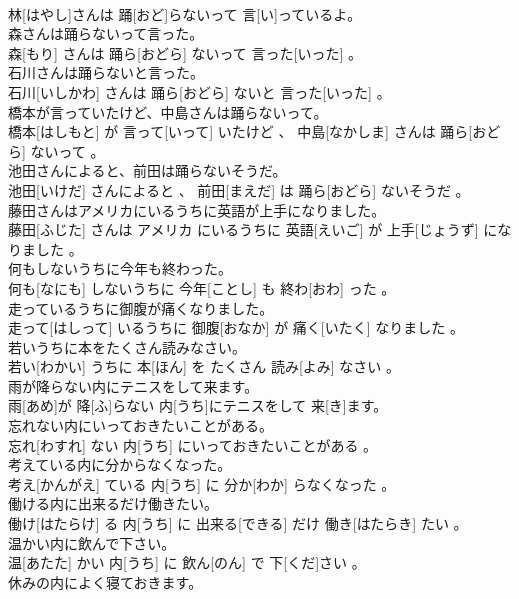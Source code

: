 \documentclass[8pt]{extreport}
\begin{document}
\begin{CJK}{UTF8}{min}
\\	林[はやし]さんは 踊[おど]らないって 言[い]っているよ。
\\	森さんは踊らないって言った。	
\\	森[もり] さんは 踊ら[おどら] ないって 言った[いった] 。
\\	石川さんは踊らないと言った。	
\\	石川[いしかわ] さんは 踊ら[おどら] ないと 言った[いった] 。
\\	橋本が言っていたけど、中島さんは踊らないって。	
\\	橋本[はしもと] が 言って[いって] いたけど 、 中島[なかしま] さんは 踊ら[おどら] ないって 。
\\	池田さんによると、前田は踊らないそうだ。	
\\	池田[いけだ] さんによると 、 前田[まえだ] は 踊ら[おどら] ないそうだ 。
\\	藤田さんはアメリカにいるうちに英語が上手になりました。	
\\	藤田[ふじた] さんは アメリカ にいるうちに 英語[えいご] が 上手[じょうず] になりました 。
\\	何もしないうちに今年も終わった。	
\\	何も[なにも] しないうちに 今年[ことし] も 終わ[おわ] った 。
\\	走っているうちに御腹が痛くなりました。	
\\	走って[はしって] いるうちに 御腹[おなか] が 痛く[いたく] なりました 。
\\	若いうちに本をたくさん読みなさい。	
\\	若い[わかい] うちに 本[ほん] を たくさん 読み[よみ] なさい 。
\\	雨が降らない内にテニスをして来ます。	
\\	雨[あめ]が 降[ふ]らない 内[うち]にテニスをして 来[き]ます。
\\	忘れない内にいっておきたいことがある。	
\\	忘れ[わすれ] ない 内[うち] にいっておきたいことがある 。
\\	考えている内に分からなくなった。	
\\	考え[かんがえ] ている 内[うち] に 分か[わか] らなくなった 。
\\	働ける内に出来るだけ働きたい。	
\\	働け[はたらけ] る 内[うち] に 出来る[できる] だけ 働き[はたらき] たい 。
\\	温かい内に飲んで下さい。	
\\	温[あたた] かい 内[うち] に 飲ん[のん] で 下[くだ]さい 。
\\	休みの内によく寝ておきます。	

\end{CJK}
\end{document}
